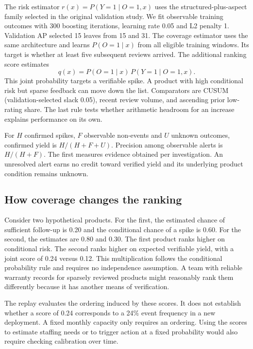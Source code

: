 \documentclass[conference]{IEEEtran}
\begin{document}
The risk estimator $r(x)=P(Y=1\mid O=1,x)$ uses the structured-plus-aspect family selected in the original validation study. We fit observable training outcomes with 300 boosting iterations, learning rate 0.05 and L2 penalty 1. Validation AP selected 15 leaves from 15 and 31. The coverage estimator uses the same architecture and learns $P(O=1\mid x)$ from all eligible training windows. Its target is whether at least five subsequent reviews arrived. The additional ranking score estimates
\begin{equation}
q(x)=P(O=1\mid x)\,P(Y=1\mid O=1,x).
\end{equation}
This joint probability targets a verifiable spike. A product with high conditional risk but sparse feedback can move down the list. Comparators are CUSUM (validation-selected slack 0.05), recent review volume, and ascending prior low-rating share. The last rule tests whether arithmetic headroom for an increase explains performance on its own.

For $H$ confirmed spikes, $F$ observable non-events and $U$ unknown outcomes, confirmed yield is $H/(H+F+U)$. Precision among observable alerts is $H/(H+F)$. The first measures evidence obtained per investigation. An unresolved alert earns no credit toward verified yield and its underlying product condition remains unknown.

\subsection{How coverage changes the ranking}
Consider two hypothetical products. For the first, the estimated chance of sufficient follow-up is 0.20 and the conditional chance of a spike is 0.60. For the second, the estimates are 0.80 and 0.30. The first product ranks higher on conditional risk. The second ranks higher on expected verifiable yield, with a joint score of 0.24 versus 0.12. This multiplication follows the conditional probability rule and requires no independence assumption. A team with reliable warranty records for sparsely reviewed products might reasonably rank them differently because it has another means of verification.

The replay evaluates the ordering induced by these scores. It does not establish whether a score of 0.24 corresponds to a 24\% event frequency in a new deployment. A fixed monthly capacity only requires an ordering. Using the scores to estimate staffing needs or to trigger action at a fixed probability would also require checking calibration over time.
\end{document}
